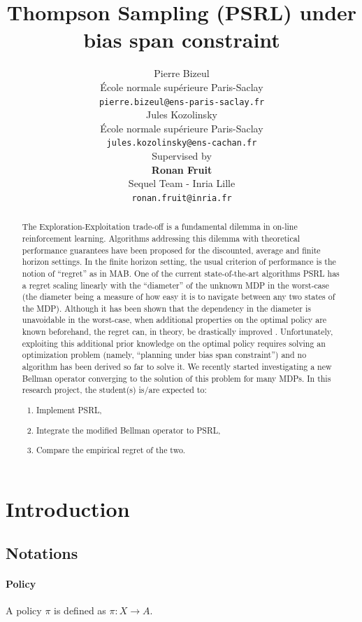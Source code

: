 \documentclass{article}
\title{Thompson Sampling (PSRL) under bias span constraint}
\author{
  Pierre Bizeul\\
  École normale supérieure Paris-Saclay \\
  \texttt{pierre.bizeul@ens-paris-saclay.fr} \\
  \And
  Jules Kozolinsky\\
  École normale supérieure Paris-Saclay \\
  \texttt{jules.kozolinsky@ens-cachan.fr} \\
\AND
Supervised by \vspace{8pt}\\
\textbf{Ronan Fruit}\\
   Sequel Team - Inria Lille \\
 \texttt{ronan.fruit@inria.fr} \\
}
\begin{document}
\maketitle
\tableofcontents

\begin{abstract}
The Exploration-Exploitation trade-off is a fundamental dilemma in on-line reinforcement learning. Algorithms addressing this dilemma with theoretical performance guarantees have been proposed for the discounted, average and finite horizon settings. In the finite horizon setting, the usual criterion of performance is the notion of “regret” as in MAB. One of the current state-of-the-art algorithms PSRL \cite{osband2013more}  has a regret scaling linearly with the “diameter” of the unknown MDP in the worst-case (the diameter being a measure of how easy it is to navigate between any two states of the MDP). Although it has been shown that the dependency in the diameter is unavoidable in the worst-case, when additional properties on the optimal policy are known beforehand, the regret can, in theory, be drastically improved \cite{bartlett2009regal}. Unfortunately, exploiting this additional prior knowledge on the optimal policy requires solving an optimization problem (namely, “planning under bias span constraint”) and no algorithm has been derived so far to solve it. We recently started investigating a new Bellman operator converging to the solution of this problem for many MDPs. In this research project, the student(s) is/are expected to:
\begin{enumerate}
\item  Implement PSRL,
\item  Integrate the modified Bellman operator to PSRL,
\item Compare the empirical regret of the two.
\end{enumerate}
\end{abstract}

\section{Introduction}
\subsection{Notations}
\paragraph{Policy\\}
A policy $\pi$ is defined as $\pi: X \rightarrow A$.
\end{document}
